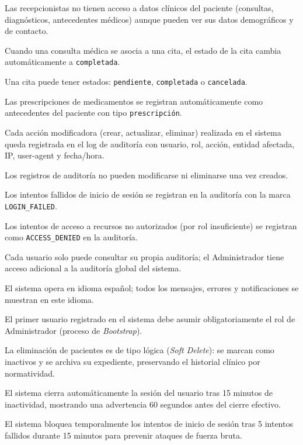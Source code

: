 \documentclass[11pt,a4paper]{article}
\begin{document}
\begin{description}[leftmargin=1.5cm,style=nextline,itemsep=4pt]
    \item[\textbf{RN16:}] Las recepcionistas no tienen acceso a datos clínicos del paciente (consultas, diagnósticos, antecedentes médicos) aunque pueden ver sus datos demográficos y de contacto.
    \item[\textbf{RN17:}] Cuando una consulta médica se asocia a una cita, el estado de la cita cambia automáticamente a \texttt{completada}.
    \item[\textbf{RN18:}] Una cita puede tener estados: \texttt{pendiente}, \texttt{completada} o \texttt{cancelada}.
    \item[\textbf{RN19:}] Las prescripciones de medicamentos se registran automáticamente como antecedentes del paciente con tipo \texttt{prescripción}.
    \item[\textbf{RN20:}] Cada acción modificadora (crear, actualizar, eliminar) realizada en el sistema queda registrada en el log de auditoría con usuario, rol, acción, entidad afectada, IP, user-agent y fecha/hora.
    \item[\textbf{RN21:}] Los registros de auditoría no pueden modificarse ni eliminarse una vez creados.
    \item[\textbf{RN22:}] Los intentos fallidos de inicio de sesión se registran en la auditoría con la marca \texttt{LOGIN\_FAILED}.
    \item[\textbf{RN23:}] Los intentos de acceso a recursos no autorizados (por rol insuficiente) se registran como \texttt{ACCESS\_DENIED} en la auditoría.
    \item[\textbf{RN24:}] Cada usuario solo puede consultar su propia auditoría; el Administrador tiene acceso adicional a la auditoría global del sistema.
    \item[\textbf{RN25:}] El sistema opera en idioma español; todos los mensajes, errores y notificaciones se muestran en este idioma.
    \item[\textbf{RN26:}] El primer usuario registrado en el sistema debe asumir obligatoriamente el rol de Administrador (proceso de \textit{Bootstrap}).
    \item[\textbf{RN27:}] La eliminación de pacientes es de tipo lógica (\textit{Soft Delete}): se marcan como inactivos y se archiva su expediente, preservando el historial clínico por normatividad.
    \item[\textbf{RN28:}] El sistema cierra automáticamente la sesión del usuario tras 15 minutos de inactividad, mostrando una advertencia 60 segundos antes del cierre efectivo.
    \item[\textbf{RN29:}] El sistema bloquea temporalmente los intentos de inicio de sesión tras 5 intentos fallidos durante 15 minutos para prevenir ataques de fuerza bruta.

\end{description}
\end{document}
